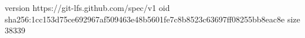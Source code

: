 version https://git-lfs.github.com/spec/v1
oid sha256:1cc153d75ce692967af509463e48b5601fe7c8b8523c63697ff08255bb8eac8e
size 38339
